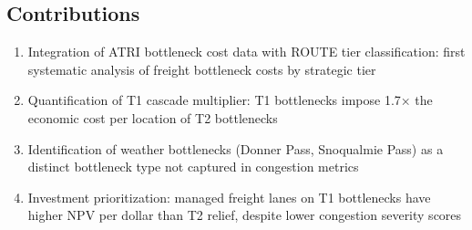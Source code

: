 \subsection*{Contributions}

\begin{enumerate}
\item Integration of ATRI bottleneck cost data with ROUTE tier classification: first systematic analysis of freight bottleneck costs by strategic tier
\item Quantification of T1 cascade multiplier: T1 bottlenecks impose 1.7× the economic cost per location of T2 bottlenecks
\item Identification of weather bottlenecks (Donner Pass, Snoqualmie Pass) as a distinct bottleneck type not captured in congestion metrics
\item Investment prioritization: managed freight lanes on T1 bottlenecks have higher NPV per dollar than T2 relief, despite lower congestion severity scores
\end{enumerate}
